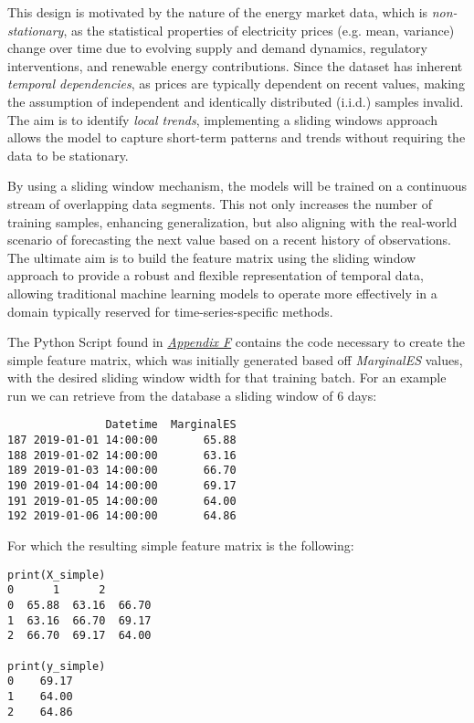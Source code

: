 \documentclass[12pt]{report} %
\begin{document}
This design is motivated by the nature of the energy market data, which is \textit{non-stationary}, as the statistical properties of electricity prices (e.g. mean, variance) change over time due to evolving supply and demand dynamics, regulatory interventions, and renewable energy contributions. Since the dataset has inherent \textit{temporal dependencies}, as prices are typically dependent on recent values, making the assumption of independent and identically distributed (i.i.d.) samples invalid. The aim is to identify \textit{local trends}, implementing a sliding windows approach allows the model to capture short-term patterns and trends without requiring the data to be stationary.

By using a sliding window mechanism, the models will be trained on a continuous stream of overlapping data segments. This not only increases the number of training samples, enhancing generalization, but also aligning with the real-world scenario of forecasting the next value based on a recent history of observations. The ultimate aim is to build the feature matrix using the sliding window approach to provide a robust and flexible representation of temporal data, allowing traditional machine learning models to operate more effectively in a domain typically reserved for time-series-specific methods.

The Python Script found in \textit{\hyperref[app:appendix_f_simple_feature_matrix]{Appendix F}} contains the code necessary to create the simple feature matrix, which was initially generated based off \textit{MarginalES} values, with the desired sliding window width for that training batch. For an example run we can retrieve from the database a sliding window of 6 days:
\begin{small}
\begin{verbatim}
               Datetime  MarginalES
187 2019-01-01 14:00:00       65.88
188 2019-01-02 14:00:00       63.16
189 2019-01-03 14:00:00       66.70
190 2019-01-04 14:00:00       69.17
191 2019-01-05 14:00:00       64.00
192 2019-01-06 14:00:00       64.86
\end{verbatim}
\end{small}

For which the resulting simple feature matrix is the following:
\begin{small}
\begin{verbatim}
print(X_simple)
0      1      2
0  65.88  63.16  66.70
1  63.16  66.70  69.17
2  66.70  69.17  64.00

print(y_simple)
0    69.17
1    64.00
2    64.86
\end{verbatim}
\end{small}
\end{document}
